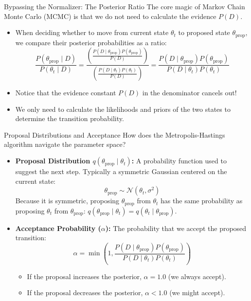\documentclass[9pt]{beamer}
\begin{document}
\begin{frame}{Bypassing the Normalizer: The Posterior Ratio}
  The core magic of Markov Chain Monte Carlo (MCMC) is that we do not need to calculate the evidence $P(D)$.
  \begin{itemize}
    \item When deciding whether to move from current state $\theta_t$ to proposed state $\theta_{\text{prop}}$, we compare their posterior probabilities as a ratio:
      $$\frac{P(\theta_{\text{prop}} \mid D)}{P(\theta_t \mid D)} = \frac{\left( \frac{P(D \mid \theta_{\text{prop}}) P(\theta_{\text{prop}})}{P(D)} \right)}{\left( \frac{P(D \mid \theta_t) P(\theta_t)}{P(D)} \right)} = \frac{P(D \mid \theta_{\text{prop}}) P(\theta_{\text{prop}})}{P(D \mid \theta_t) P(\theta_t)}$$
    \item Notice that the evidence constant $P(D)$ in the denominator cancels out!
    \item We only need to calculate the likelihoods and priors of the two states to determine the transition probability.
  \end{itemize}
\end{frame}

\begin{frame}{Proposal Distributions and Acceptance}
  How does the Metropolis-Hastings algorithm navigate the parameter space?
  \begin{itemize}
    \item \textbf{Proposal Distribution $q(\theta_{\text{prop}} \mid \theta_t)$:}
      A probability function used to suggest the next step. Typically a symmetric Gaussian centered on the current state:
      $$\theta_{\text{prop}} \sim \mathcal{N}(\theta_t, \sigma^2)$$
      Because it is symmetric, proposing $\theta_{\text{prop}}$ from $\theta_t$ has the same probability as proposing $\theta_t$ from $\theta_{\text{prop}}$: $q(\theta_{\text{prop}} \mid \theta_t) = q(\theta_t \mid \theta_{\text{prop}})$.
    \item \textbf{Acceptance Probability ($\alpha$):}
      The probability that we accept the proposed transition:
      $$\alpha = \min\left(1, \frac{P(D \mid \theta_{\text{prop}}) P(\theta_{\text{prop}})}{P(D \mid \theta_t) P(\theta_t)}\right)$$
      \begin{itemize}
        \item If the proposal increases the posterior, $\alpha = 1.0$ (we always accept).
        \item If the proposal decreases the posterior, $\alpha < 1.0$ (we might accept).
      \end{itemize}
  \end{itemize}
\end{frame}
\end{document}
